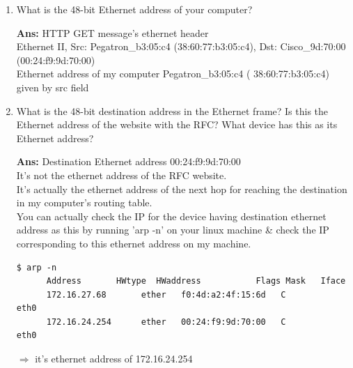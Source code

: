 \documentclass[a4,11pt]{article}
\newenvironment{que}
{ \color{YellowGreen}
  \begin{question}
}
{ \end{question} }
\newenvironment{sol}
{ \color{Black}
  \begin{solution}
}
{ \end{solution} }
\begin{document}
\begin{enumerate}
  \item 
  \begin{que}
   What is the 48-bit Ethernet address of your computer?
  \end{que}

  \begin{sol}
    \textbf{Ans:} HTTP GET message's ethernet header \\
      Ethernet II, Src: Pegatron\_b3:05:c4 (38:60:77:b3:05:c4), Dst: Cisco\_9d:70:00 (00:24:f9:9d:70:00) \\
      Ethernet address of my computer	 Pegatron\_b3:05:c4 ( 38:60:77:b3:05:c4) given by src field
  \end{sol}

  
   \item
   \begin{que}
    What is the 48-bit destination address in the Ethernet frame? 
    Is this the Ethernet address of the website with the RFC?  What device has this as its Ethernet address?
   \end{que}

   \begin{sol}
      \textbf{Ans:} Destination Ethernet address 		00:24:f9:9d:70:00	\\

      It's not the ethernet address of the RFC website. \\
      It's actually the ethernet address of the next hop for reaching the destination in my computer's routing table. \\

      You can actually check the IP for the device having destination ethernet address as this by 
      running 'arp -n' on your linux machine \& check the IP corresponding to this ethernet address on my machine.
    \begin{adjustwidth}{-2cm}{}
      \begin{lstlisting}[style=bash]
      $ arp -n
      Address     	HWtype  HWaddress           Flags Mask   Iface
      172.16.27.68       ether   f0:4d:a2:4f:15:6d   C            eth0
      172.16.24.254      ether   00:24:f9:9d:70:00   C            eth0
      \end{lstlisting}
      \end{adjustwidth}
      
      $\Rightarrow$ it's ethernet address of 172.16.24.254
   \end{sol}


\end{enumerate}
\end{document}
